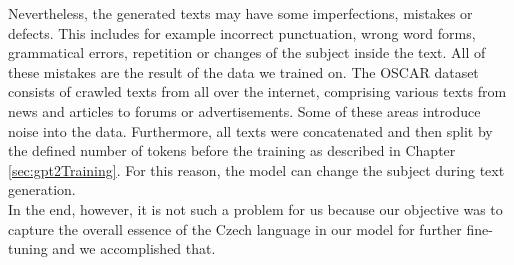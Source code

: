 Nevertheless, the generated texts may have some imperfections, mistakes or defects. This includes for example incorrect punctuation, wrong word forms, grammatical errors, repetition or changes of the subject inside the text. All of these mistakes are the result of the data we trained on. The OSCAR dataset consists of crawled texts from all over the internet, comprising various texts from news and articles to forums or advertisements. Some of these areas introduce noise into the data. Furthermore, all texts were concatenated and then split by the defined number of tokens before the training as described in Chapter \ref{sec:gpt2Training}. For this reason, the model can change the subject during text generation.\\

In the end, however, it is not such a problem for us because our objective was to capture the overall essence of the Czech language in our model for further fine-tuning and we accomplished that.

